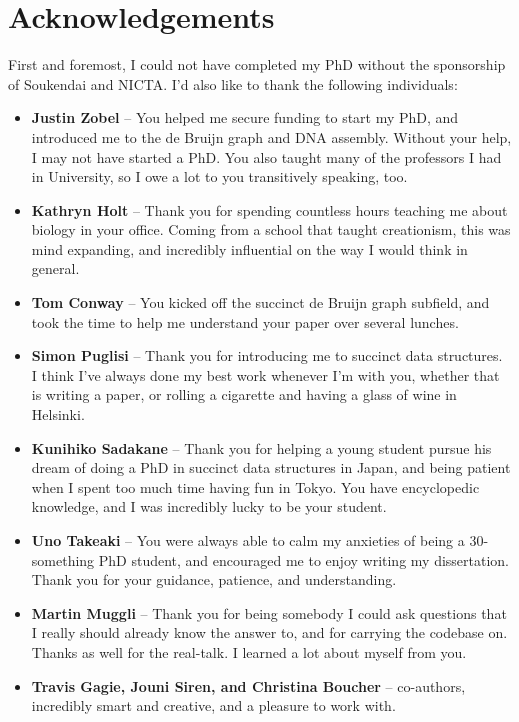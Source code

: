 \chapter*{Acknowledgements}

First and foremost, I could not have completed my PhD without the sponsorship of Soukendai and NICTA.
I’d also like to thank the following individuals:

\begin{itemize}
\item \textbf{Justin Zobel} -- You helped me secure funding to start my PhD, and introduced me to the de Bruijn graph and DNA assembly. Without your help, I may not have started a PhD. You also taught many of the professors I had in University, so I owe a lot to you transitively speaking, too.
\item \textbf{Kathryn Holt} -- Thank you for spending countless hours teaching me about biology in your office. Coming from a school that taught creationism, this was mind expanding, and incredibly influential on the way I would think in general.
\item \textbf{Tom Conway} -- You kicked off the succinct de Bruijn graph subfield, and took the time to help me understand your paper over several lunches.
\item \textbf{Simon Puglisi} -- Thank you for introducing me to succinct data structures. I think I’ve always done my best work whenever I’m with you, whether that is writing a paper, or rolling a cigarette and having a glass of wine in Helsinki.
\item \textbf{Kunihiko Sadakane} -- Thank you for helping a young student pursue his dream of doing a PhD in succinct data structures in Japan, and being patient when I spent too much time having fun in Tokyo. You have encyclopedic knowledge, and I was incredibly lucky to be your student.
\item \textbf{Uno Takeaki} -- You were always able to calm my anxieties of being a 30-something PhD student, and encouraged me to enjoy writing my dissertation. Thank you for your guidance, patience, and understanding.
\item \textbf{Martin Muggli} -- Thank you for being somebody I could ask questions that I really should already know the answer to, and for carrying the codebase on. Thanks as well for the real-talk. I learned a lot about myself from you.
\item \textbf{Travis Gagie, Jouni Siren, and Christina Boucher} -- co-authors, incredibly smart and creative, and a pleasure to work with.

\end{itemize}
